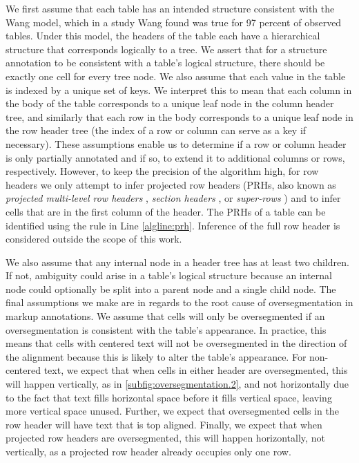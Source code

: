 \documentclass[10pt,twocolumn,letterpaper]{article}
\begin{document}
We first assume that each table has an intended structure consistent with the Wang model\cite{wang1996tabular}, which in a study Wang found was true for 97 percent of observed tables.
Under this model, the headers of the table each have a hierarchical structure that corresponds logically to a tree.
We assert that for a structure annotation to be consistent with a table's logical structure, there should be exactly one cell for every tree node.
We also assume that each value in the table is indexed by a unique set of keys.
We interpret this to mean that each column in the body of the table corresponds to a unique leaf node in the column header tree, and similarly that each row in the body corresponds to a unique leaf node in the row header tree (the index of a row or column can serve as a key if necessary).
These assumptions enable us to determine if a row or column header is only partially annotated and if so, to extend it to additional columns or rows, respectively.
However, to keep the precision of the algorithm high, for row headers we only attempt to infer projected row headers (PRHs, also known as \textit{projected multi-level row headers} \cite{hu2000table}, \textit{section headers} \cite{pinto2003table}, or \textit{super-rows} \cite{tengli2004learning}) and to infer cells that are in the first column of the header.
The PRHs of a table can be identified using the rule in Line \ref{algline:prh}.
Inference of the full row header is considered outside the scope of this work.

We also assume that any internal node in a header tree has at least two children.
If not, ambiguity could arise in a table's logical structure because an internal node could optionally be split into a parent node and a single child node.
The final assumptions we make are in regards to the root cause of oversegmentation in markup annotations.
We assume that cells will only be oversegmented if an oversegmentation is consistent with the table's appearance.
In practice, this means that cells with centered text will not be oversegmented in the direction of the alignment because this is likely to alter the table's appearance.
For non-centered text, we expect that when cells in either header are oversegmented, this will happen vertically, as in \cref{subfig:oversegmentation.2}, and not horizontally due to the fact that text fills horizontal space before it fills vertical space, leaving more vertical space unused.
Further, we expect that oversegmented cells in the row header will have text that is top aligned.
Finally, we expect that when projected row headers are oversegmented, this will happen horizontally, not vertically, as a projected row header already occupies only one row.
\end{document}
